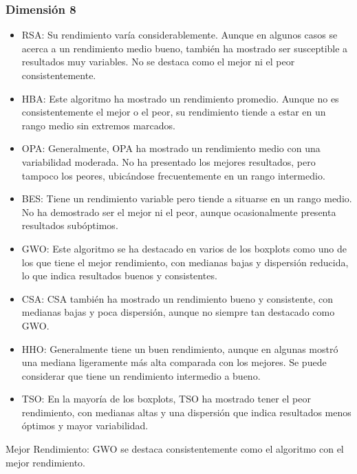 \documentclass[conference]{IEEEtran}
\begin{document}
\subsubsection{Dimensión 8}
\begin{itemize}
	\item RSA: Su rendimiento varía considerablemente. Aunque en algunos casos se acerca a un rendimiento medio bueno, también ha mostrado ser susceptible a resultados muy variables. No se destaca como el mejor ni el peor consistentemente.
	
	\item HBA: Este algoritmo ha mostrado un rendimiento promedio. Aunque no es consistentemente el mejor o el peor, su rendimiento tiende a estar en un rango medio sin extremos marcados.
	
	\item OPA: Generalmente, OPA ha mostrado un rendimiento medio con una variabilidad moderada. No ha presentado los mejores resultados, pero tampoco los peores, ubicándose frecuentemente en un rango intermedio.
	
	\item BES: Tiene un rendimiento variable pero tiende a situarse en un rango medio. No ha demostrado ser el mejor ni el peor, aunque ocasionalmente presenta resultados subóptimos.
	
	\item GWO: Este algoritmo se ha destacado en varios de los boxplots como uno de los que tiene el mejor rendimiento, con medianas bajas y dispersión reducida, lo que indica resultados buenos y consistentes.
	
	\item CSA: CSA también ha mostrado un rendimiento bueno y consistente, con medianas bajas y poca dispersión, aunque no siempre tan destacado como GWO.
	
	\item HHO: Generalmente tiene un buen rendimiento, aunque en algunas mostró una mediana ligeramente más alta comparada con los mejores. Se puede considerar que tiene un rendimiento intermedio a bueno.
	
	\item TSO: En la mayoría de los boxplots, TSO ha mostrado tener el peor rendimiento, con medianas altas y una dispersión que indica resultados menos óptimos y mayor variabilidad.
	
\end{itemize}
\noindent Mejor Rendimiento: GWO se destaca consistentemente como el algoritmo con el mejor rendimiento.
\end{document}
